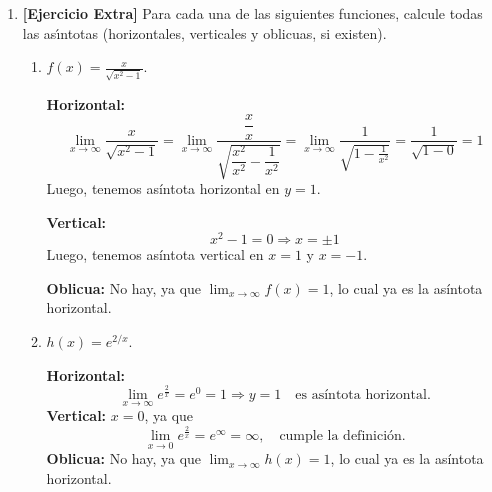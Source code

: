 \documentclass[letterpaper,12pt]{article}
\theoremstyle{plain}
\theoremstyle{definition}
\newcommand{\1}{\mathbbm{1}}
\begin{document}
\begin{enumerate}[label=\textbf{P\arabic*.}, itemsep=0cm]
\begin{enumerate}
 \vspace{0.5em}
 \color{blue}
      Partamos recordando el siguiente \textbf{Límite notable:}
\[
\lim_{x \to \infty} \left(1 + \frac{1}{x}\right)^x = e
\]
Arreglemoslo un poquito, sea \(\frac{1}{x} = u\), cuando \( x \to \infty \), entonces \(u \to 0\), reemplazando:
\[
\Rightarrow \lim_{x \to \infty} \left(1 + \frac{1}{x}\right)^x = \lim_{u \to 0} (1 + u)^{\frac{1}{u}} = e
\]
Ahora resolvemos el límite, tenemos que
\[
\lim_{x \to \frac{\pi}{2}} (1 + \cos(x))^{3 \sec(x)}
= \lim_{x \to \frac{\pi}{2}} (1 + \cos(x))^{\frac{3}{\cos(x)}}
\]
Cambio de variable! Sea \(\cos(x) = u\), entonces cuando \(x \to \frac{\pi}{2} \Rightarrow u \to 0\), reemplazando:
\[
\Rightarrow \lim_{x \to \frac{\pi}{2}} (1 + \cos(x))^{\frac{3}{\cos(x)}} =\lim_{u \to 0} (1 + u)^{\frac{3}{u}} = \left( \lim_{u \to 0} (1 + u)^{\frac{1}{u}} \right)^3 = e^3 \quad \textcolor{blue}{\text{(Por el límite notable del inicio)}}
\]
\color{black}
\end{enumerate}
\item \textbf{[Ejercicio Extra]} Para cada una de las siguientes funciones, calcule todas las as\'{\i}ntotas (horizontales, verticales y oblicuas, si existen).
\begin{enumerate}
    \item $\displaystyle f(x) = \frac{x}{\sqrt{x^2 - 1}}$.
    
     \color{blue}

\textbf{Horizontal:} 
\[
 \lim_{x \to \infty} \frac{x}{\sqrt{x^2 - 1}} = 
\lim_{x \to \infty} \frac{\dfrac{x}{x}}{\sqrt{\dfrac{x^2}{x^2} - \dfrac{1}{x^2}}} =
\lim_{x \to \infty} \frac{1}{\sqrt{1 - \frac{1}{x^2}}}
= \frac{1}{\sqrt{1 - 0}} = 1
\]
Luego, tenemos asíntota horizontal en \( y = 1 \).

\textbf{Vertical:}
\[
x^2 - 1 = 0 \Rightarrow x = \pm 1 
\]
Luego, tenemos asíntota vertical en \( x = 1 \) y $x=-1$.

\textbf{Oblicua:} No hay, ya que $\displaystyle \lim_{x\to \infty} f(x)=1$, lo cual ya es la asíntota horizontal.
\color{black}
    
    \item $\displaystyle h(x) = e^{2/x}$.

 \color{blue}
    
\textbf{Horizontal:}
\[
\lim_{x \to \infty} e^{\frac{2}{x}} = e^0 = 1 \Rightarrow y = 1 \quad \text{es asíntota horizontal.}
\]
\textbf{Vertical:} \( x = 0 \), ya que 
\[
\lim_{x \to 0} e^{\frac{2}{x}} = e^{\infty} = \infty,
\quad \text{cumple la definición.}
\]
\textbf{Oblicua:} No hay, ya que $\displaystyle \lim_{x\to \infty} h(x)=1$, lo cual ya es la asíntota horizontal.
\color{black}
\end{enumerate}


\end{enumerate}
\end{document}
